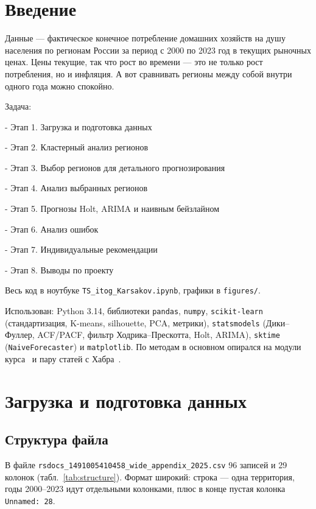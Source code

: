 \documentclass[12pt,a4paper]{report}
\begin{document}
\tableofcontents
\newpage

\chapter*{Введение}

Данные --- фактическое конечное потребление домашних хозяйств на душу населения по регионам России за период с 2000 по 2023 год в текущих рыночных ценах.
Цены текущие, так что рост во времени --- это не только рост потребления, но и инфляция. А вот сравнивать регионы между собой внутри одного года можно спокойно.

Задача:

- Этап 1. Загрузка и подготовка данных

- Этап 2. Кластерный анализ регионов

- Этап 3. Выбор регионов для детального прогнозирования

- Этап 4. Анализ выбранных регионов

- Этап 5. Прогнозы Holt, ARIMA и наивным бейзлайном

- Этап 6. Анализ ошибок

- Этап 7. Индивидуальные рекомендации

- Этап 8. Выводы по проекту


Весь код в ноутбуке \texttt{TS\_itog\_Karsakov.ipynb}, графики в \texttt{figures/}. 

Использован: Python 3.14, библиотеки \texttt{pandas}, \texttt{numpy}, \texttt{scikit-learn} (стандартизация, K-means, silhouette, PCA, метрики), \texttt{statsmodels} (Дики--Фуллер, ACF/PACF, фильтр Ходрика--Прескотта, Holt, ARIMA), \texttt{sktime} (\texttt{NaiveForecaster}) и \texttt{matplotlib}. По методам в основном опирался на модули курса~\cite{sf-m1,sf-m2,sf-m3,sf-m4,sf-m5} и пару статей с Хабра~\cite{habr-ods,habr-arima}.

\chapter{Загрузка и подготовка данных}

\section{Структура файла}

В файле \texttt{rsdocs\_1491005410458\_wide\_appendix\_2025.csv} 96 записей и 29 колонок (табл.~\ref{tab:structure}). Формат широкий: строка --- одна территория, годы 2000--2023 идут отдельными колонками, плюс в конце пустая колонка \texttt{Unnamed: 28}.
\end{document}
